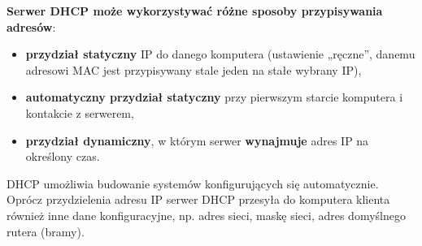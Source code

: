 \documentclass[../main.tex]{subfiles}
\begin{document}
    \textbf{Serwer DHCP może wykorzystywać różne sposoby przypisywania adresów}:
    \begin{itemize}
        \item \textbf{przydział statyczny} IP do danego komputera (ustawienie „ręczne”, danemu adresowi
        MAC jest przypisywany stale jeden na stałe wybrany IP),
        \item \textbf{automatyczny przydział statyczny} przy pierwszym starcie komputera i kontakcie z
        serwerem,
        \item \textbf{przydział dynamiczny}, w którym serwer \textbf{wynajmuje} adres IP na określony czas.
    \end{itemize}
    DHCP umożliwia budowanie systemów konfigurujących się automatycznie.
    Oprócz przydzielenia adresu IP serwer DHCP przesyła do komputera klienta również inne
    dane konfiguracyjne, np. adres sieci, maskę sieci, adres domyślnego rutera (bramy).
\end{document}
